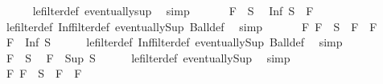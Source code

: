 \begin{isabellebody}
\ \ \ \ \isamarkupfalse%
\ le{\isacharunderscore}{\kern0pt}filter{\isacharunderscore}{\kern0pt}def\ eventually{\isacharunderscore}{\kern0pt}sup\ \isamarkupfalse%
\ simp\ \isacommand{{\isacharbraceright}{\kern0pt}}\isamarkupfalse%
\isanewline
\ \ \isacommand{{\isacharbraceleft}{\kern0pt}}\isamarkupfalse%
\ \isamarkupfalse%
\ {\isachardoublequoteopen}F{\isacharprime}{\kern0pt}{\isacharprime}{\kern0pt}\ {\isasymin}\ S{\isachardoublequoteclose}\ \isamarkupfalse%
\ {\isachardoublequoteopen}Inf\ S\ {\isasymle}\ F{\isacharprime}{\kern0pt}{\isacharprime}{\kern0pt}{\isachardoublequoteclose}\isanewline
\ \ \ \ \isamarkupfalse%
\ le{\isacharunderscore}{\kern0pt}filter{\isacharunderscore}{\kern0pt}def\ Inf{\isacharunderscore}{\kern0pt}filter{\isacharunderscore}{\kern0pt}def\ eventually{\isacharunderscore}{\kern0pt}Sup\ Ball{\isacharunderscore}{\kern0pt}def\ \isamarkupfalse%
\ simp\ \isacommand{{\isacharbraceright}{\kern0pt}}\isamarkupfalse%
\isanewline
\ \ \isacommand{{\isacharbraceleft}{\kern0pt}}\isamarkupfalse%
\ \isamarkupfalse%
\ {\isachardoublequoteopen}{\isasymAnd}F{\isacharprime}{\kern0pt}{\isachardot}{\kern0pt}\ F{\isacharprime}{\kern0pt}\ {\isasymin}\ S\ {\isasymLongrightarrow}\ F\ {\isasymle}\ F{\isacharprime}{\kern0pt}{\isachardoublequoteclose}\ \isamarkupfalse%
\ {\isachardoublequoteopen}F\ {\isasymle}\ Inf\ S{\isachardoublequoteclose}\isanewline
\ \ \ \ \isamarkupfalse%
\ le{\isacharunderscore}{\kern0pt}filter{\isacharunderscore}{\kern0pt}def\ Inf{\isacharunderscore}{\kern0pt}filter{\isacharunderscore}{\kern0pt}def\ eventually{\isacharunderscore}{\kern0pt}Sup\ Ball{\isacharunderscore}{\kern0pt}def\ \isamarkupfalse%
\ simp\ \isacommand{{\isacharbraceright}{\kern0pt}}\isamarkupfalse%
\isanewline
\ \ \isacommand{{\isacharbraceleft}{\kern0pt}}\isamarkupfalse%
\ \isamarkupfalse%
\ {\isachardoublequoteopen}F\ {\isasymin}\ S{\isachardoublequoteclose}\ \isamarkupfalse%
\ {\isachardoublequoteopen}F\ {\isasymle}\ Sup\ S{\isachardoublequoteclose}\isanewline
\ \ \ \ \isamarkupfalse%
\ le{\isacharunderscore}{\kern0pt}filter{\isacharunderscore}{\kern0pt}def\ eventually{\isacharunderscore}{\kern0pt}Sup\ \isamarkupfalse%
\ simp\ \isacommand{{\isacharbraceright}{\kern0pt}}\isamarkupfalse%
\isanewline
\ \ \isacommand{{\isacharbraceleft}{\kern0pt}}\isamarkupfalse%
\ \isamarkupfalse%
\ {\isachardoublequoteopen}{\isasymAnd}F{\isachardot}{\kern0pt}\ F\ {\isasymin}\ S\ {\isasymLongrightarrow}\ F\ {\isasymle}\ F{\isacharprime}{\kern0pt}{\isachardoublequoteclose}\ \isamarkupfalse%

\end{isabellebody}
